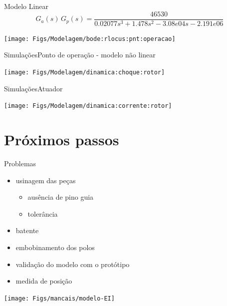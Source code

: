 \documentclass{beamer}
\begin{document}
\begin{frame}{Modelo Linear }
\[
G_a(s) \, G_p(s) = \frac{46530}{ 0.02077 s^3 + 1.478 s^2 - 3.08e04 s - 2.191e06}
\]
	\begin{center}
	\texttt{[image: Figs/Modelagem/bode:rlocus:pnt:operacao]}
	\end{center}
\end{frame}

\begin{frame}{Simulações}{Ponto de operação - modelo não linear}
\begin{center}
	\texttt{[image: Figs/Modelagem/dinamica:choque:rotor]}
\end{center}
\end{frame}

\begin{frame}{Simulações}{Atuador}
\begin{center}
	\texttt{[image: Figs/Modelagem/dinamica:corrente:rotor]}
\end{center}
\end{frame}

\section{Próximos passos}

\begin{frame}{Problemas}
	\begin{itemize}
		\item usinagem das peças
		\begin{itemize}
			\item ausência de pino guia
			\item tolerância
		\end{itemize}
		\item batente 
		\item embobinamento dos polos
		\item validação do modelo com o protótipo
		\item medida de posição
	\end{itemize}
	
	
	\begin{center}
	\texttt{[image: Figs/mancais/modelo-EI]}
	\end{center}
	
\end{frame}
\end{document}
